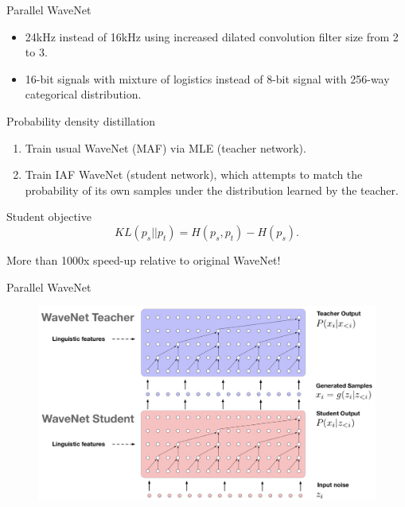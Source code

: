 \documentclass{beamer}
\begin{document}
\begin{frame}{Parallel WaveNet}
	\begin{itemize}
		\item 24kHz instead of 16kHz using increased dilated convolution filter size from 2 to 3.
		\item 16-bit signals with mixture of logistics instead of 8-bit signal with 256-way categorical distribution.
	\end{itemize}
	\begin{block}{Probability density distillation}
		\begin{enumerate}
			\item Train usual WaveNet (MAF) via MLE (teacher network).
			\item Train IAF WaveNet (student network), which attempts to match the probability of its own samples under the distribution learned by the teacher.
		\end{enumerate}
	\end{block}
	\vspace{-0.3cm}
	\begin{block}{Student objective}
		\vspace{-0.3cm}
		\[
			KL(p_s || p_t) = H(p_s, p_t) - H(p_s).
		\]
		\vspace{-0.3cm}
	\end{block}
	More than 1000x speed-up relative to original WaveNet!
\end{frame}
\begin{frame}{Parallel WaveNet}
	\begin{figure}
		\centering
		\includegraphics[width=\linewidth]{figs/parallel_wavenet.png}
	\end{figure}

\end{frame}
\end{document}
